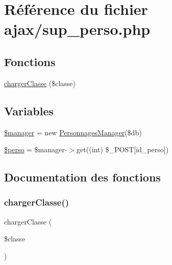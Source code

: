 \hypertarget{sup__perso_8php}{}\section{Référence du fichier ajax/sup\+\_\+perso.php}
\label{sup__perso_8php}
\subsection*{Fonctions}
\begin{DoxyCompactItemize}
\item 
\mbox{\hyperlink{sup__perso_8php_a6bdbbd60a21fa5e8c1db3f7596a47013}{charger\+Classe}} (\$classe)
\end{DoxyCompactItemize}
\subsection*{Variables}
\begin{DoxyCompactItemize}
\item 
\mbox{\hyperlink{sup__perso_8php_a4621b1cd69b1417c9fb966c825299de1}{\$manager}} = new \mbox{\hyperlink{class_personnages_manager}{Personnages\+Manager}}(\$db)
\item 
\mbox{\hyperlink{sup__perso_8php_a648bcc9981df7cceb4b931a80064a6c5}{\$perso}} = \$manager-\/$>$get((int) \$\+\_\+\+P\+O\+ST\mbox{[}\textquotesingle{}id\+\_\+perso\textquotesingle{}\mbox{]})
\end{DoxyCompactItemize}


\subsection{Documentation des fonctions}
\mbox{\label{sup__perso_8php_a6bdbbd60a21fa5e8c1db3f7596a47013}} 
\subsubsection{\texorpdfstring{charger\+Classe()}{chargerClasse()}}
{\footnotesize\ttfamily charger\+Classe (\begin{DoxyParamCaption}\item[{}]{\$classe }\end{DoxyParamCaption})}




